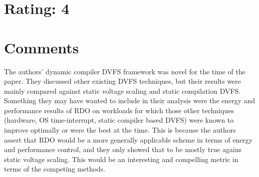 \documentclass [12pt]{article}
\begin{document}
    \section{Rating: 4} %
    \label{sec:rating}
    \pagebreak

    \section{Comments} %
    \label{sec:comments}

    The authors' dynamic compiler DVFS framework was novel for the time of the paper. They discussed other existing DVFS techniques, but their results were mainly compared against static voltage scaling and static compilation DVFS. Something they may have wanted to include in their analysis were the energy and performance results of RDO on workloads for which those other techniques (hardware, OS time-interrupt, static compiler based DVFS) were known to improve optimally or were the best at the time. This is because the authors assert that RDO would be a more generally applicable scheme in terms of energy and performance control, and they only showed that to be mostly true agains static voltage scaling. This would be an interesting and compelling metric in terms of the competing methods. 



 
        
\end{document}
